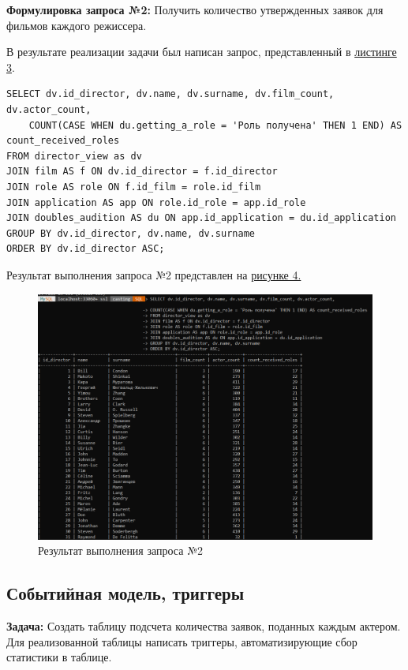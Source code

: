\documentclass[11pt,a4paper,final]{article} %
\begin{document}
\textbf{Формулировка запроса №2:} Получить количество утвержденных заявок для фильмов каждого режиссера.

\par В результате реализации задачи был написан запрос, представленный в \hyperref[lst:l3]{листинге 3}.

\begin{lstlisting}[caption={Код запроса, использующего представление}, label=lst:l3]
SELECT dv.id_director, dv.name, dv.surname, dv.film_count, dv.actor_count, 
	COUNT(CASE WHEN du.getting_a_role = 'Роль получена' THEN 1 END) AS count_received_roles
FROM director_view as dv
JOIN film AS f ON dv.id_director = f.id_director
JOIN role AS role ON f.id_film = role.id_film
JOIN application AS app ON role.id_role = app.id_role
JOIN doubles_audition AS du ON app.id_application = du.id_application
GROUP BY dv.id_director, dv.name, dv.surname
ORDER BY dv.id_director ASC;
\end{lstlisting}

Результат выполнения запроса №2 представлен на \hyperref[fig:pic4]{рисунке 4.}

\newpage
\begin{figure}[H]
	\centering
	\includegraphics[width=0.9\linewidth]{pic4.png}
	\caption{Результат выполнения запроса №2}
	\label{fig:pic4}
\end{figure}


\subsection{Событийная модель, триггеры}
\textbf{Задача:} Создать таблицу подсчета количества заявок, поданных каждым актером. Для реализованной таблицы написать триггеры, автоматизирующие сбор статистики в таблице.
\end{document}
